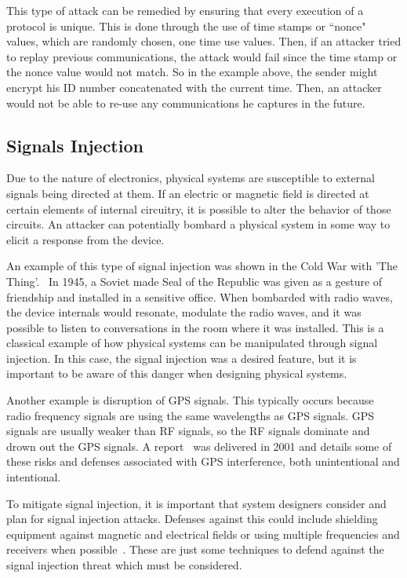 This type of attack can be remedied by ensuring that every execution of a protocol is unique. This is done through the use of
time stamps or ``nonce" values, which are randomly chosen, one time use values. Then, if an attacker tried to replay previous
communications, the attack would fail since the time stamp or the nonce value would not match. So in the example above, the
sender might encrypt his ID number concatenated with the current time. Then, an attacker would not be able to re-use any
communications he captures in the future.

\subsection{Signals Injection}
Due to the nature of electronics, physical systems are susceptible to external signals being directed at them. If an electric or 
magnetic field is directed at certain elements of internal circuitry, it is possible to alter the behavior of those circuits. An attacker
can potentially bombard a physical system in some way to elicit a response from the device.

An example of this type of signal injection was shown in the Cold War with 'The Thing'.~\cite{thing} In 1945, a Soviet made Seal of the 
Republic was given as a gesture of friendship and installed in a sensitive office. When bombarded with radio waves, the device internals
would resonate, modulate the radio waves, and it was possible to listen to conversations in the room where it was installed. This is a
classical example of how physical systems can be manipulated through signal injection. In this case, the signal injection was a desired
feature, but it is important to be aware of this danger when designing physical systems.

Another example is disruption of GPS signals. This typically occurs because radio frequency signals are using the same wavelengths as
GPS signals. GPS signals are usually weaker than RF signals, so the RF signals dominate and drown out the GPS signals. A report~\cite{gpsdisruption} 
was delivered in 2001 and details some of these risks and defenses associated with GPS interference, both unintentional and intentional.

To mitigate signal injection, it is important that system designers consider and plan for signal injection attacks. Defenses against this could
include shielding equipment against magnetic and electrical fields or using multiple frequencies and receivers when possible~\cite{gpsdisruption}.
These are just some techniques to defend against the signal injection threat which must be considered.


